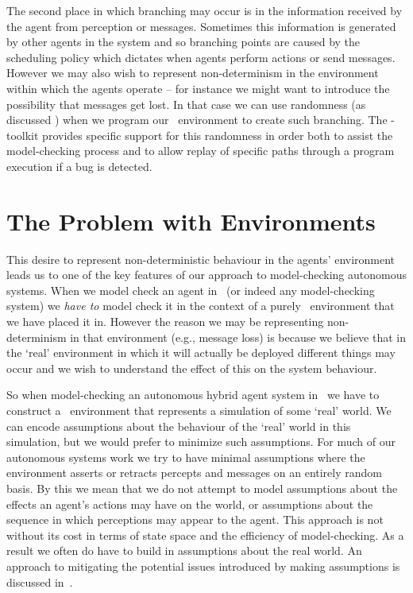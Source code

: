 The second place in which branching may occur is in the information
received by the agent from perception or messages.  Sometimes this
information is generated by other agents in the system and so branching
points are caused by the scheduling policy which dictates when agents
perform actions or send messages.  However we may also wish to
represent non-determinism in the environment within which the agents
operate -- for instance we might want to introduce the possibility
that messages get lost.  In that case we can use randomness (as discussed ) when we
program our \java\ environment to create such branching.
The \ail-toolkit provides specific support for this randomness in
order both to assist the model-checking process and to allow replay of
specific paths through a program execution if a bug is detected.

\section{The Problem with Environments}
%
This desire to represent non-deterministic behaviour in the agents' environment leads
us to one of the key features of our approach to model-checking autonomous systems.
When we model check an agent in \ajpf\ (or indeed any model-checking system) we \emph{have to} model check it in the context
of a purely \java\ environment that we have placed it in.  However the reason we may be
representing non-determinism in that environment (e.g., message loss) is because we
believe that in the `real' environment in which it will actually be deployed different things 
may occur and we wish to understand the effect of this on the system behaviour.

So when model-checking 
an autonomous hybrid agent system in \ajpf\ we have to construct a \java\ environment that represents a simulation of
some `real' world.  We can encode assumptions about the behaviour of the
`real' world in this simulation, but we would prefer to minimize such
assumptions.  For much of our autonomous systems work we try to have
minimal assumptions where the environment asserts or retracts percepts
and messages on an entirely random basis.  By this we mean that we do not attempt to model assumptions about the effects an agent's actions may have on the world, or assumptions about the sequence in which perceptions may appear to the agent.  This approach is not without its cost in terms of state space and the efficiency of model-checking.  As a result we often do have to build in assumptions about the real world.  An approach to mitigating the potential issues introduced by making assumptions is discussed in~\cite{Ferrando21}.

